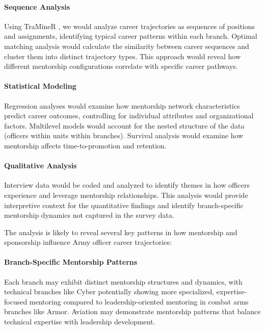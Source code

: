 \documentclass[main.tex]{subfiles}
\begin{document}
\paragraph{Sequence Analysis} Using TraMineR \parencite{traminer2023sequence}, we would analyze career trajectories as sequences of positions and assignments, identifying typical career patterns within each branch. Optimal matching analysis would calculate the similarity between career sequences and cluster them into distinct trajectory types. This approach would reveal how different mentorship configurations correlate with specific career pathways.

\paragraph{Statistical Modeling} Regression analyses would examine how mentorship network characteristics predict career outcomes, controlling for individual attributes and organizational factors. Multilevel models would account for the nested structure of the data (officers within units within branches). Survival analysis would examine how mentorship affects time-to-promotion and retention.

\paragraph{Qualitative Analysis} Interview data would be coded and analyzed to identify themes in how officers experience and leverage mentorship relationships. This analysis would provide interpretive context for the quantitative findings and identify branch-specific mentorship dynamics not captured in the survey data.


The analysis is likely to reveal several key patterns in how mentorship and sponsorship influence Army officer career trajectories:

\paragraph{Branch-Specific Mentorship Patterns} Each branch may exhibit distinct mentorship structures and dynamics, with technical branches like Cyber potentially showing more specialized, expertise-focused mentoring compared to leadership-oriented mentoring in combat arms branches like Armor. Aviation may demonstrate mentorship patterns that balance technical expertise with leadership development.
\end{document}
